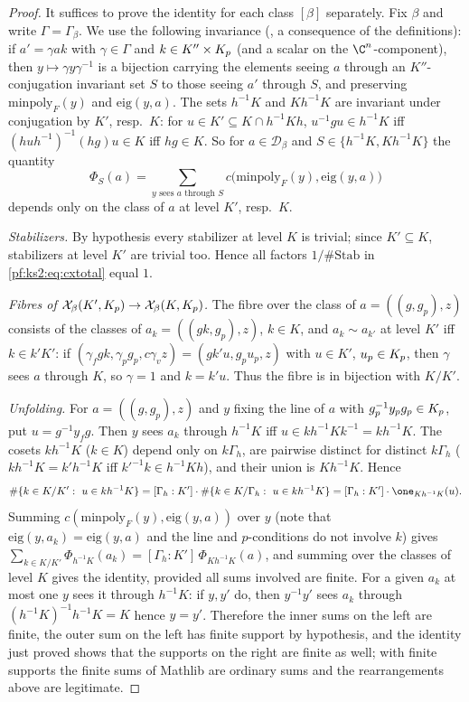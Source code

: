 \begin{proof}
It suffices to prove the identity for each class $[\beta]$ separately.
Fix $\beta$ and write $\Gamma=\Gamma_\beta$. We use the following invariance
(, a consequence of the definitions): if $a'=\gamma a k$
with $\gamma\in\Gamma$ and $k\in K''\times K_{p}$ (and a scalar on the $\C^n$-component), then
$y\mapsto\gamma y\gamma^{-1}$ is a bijection carrying the elements seeing $a$ through an
$K''$-conjugation invariant set $S$ to those seeing $a'$ through $S$, and preserving
$\mathrm{minpoly}_F(y)$ and $\mathrm{eig}(y,a)$. The sets $h^{-1}K$ and $Kh^{-1}K$ are invariant under
conjugation by $K'$, resp.\ $K$: for $u\in K'\subseteq K\cap h^{-1}Kh$, $u^{-1}gu\in h^{-1}K$ iff
$(huh^{-1})^{-1}(hg)u\in K$ iff $hg\in K$. So for $a\in\mathcal{D}_\beta$ and $S\in\{h^{-1}K,Kh^{-1}K\}$
the quantity
\[
\Phi_S(a)=\sum_{y\text{ sees }a\text{ through }S}c\bigl(\mathrm{minpoly}_F(y),\mathrm{eig}(y,a)\bigr)
\]
depends only on the class of $a$ at level $K'$, resp.\ $K$.

\emph{Stabilizers.} By hypothesis every stabilizer at level $K$ is trivial; since $K'\subseteq K$,
stabilizers at level $K'$ are trivial too. Hence all factors $1/\#\mathrm{Stab}$ in
\eqref{pf:ks2:eq:cxtotal} equal $1$.

\emph{Fibres of $\mathcal{X}_\beta(K',K_{p})\to\mathcal{X}_\beta(K,K_{p})$.} The fibre over the
class of $a=((g,g_p),z)$ consists of the classes of $a_k=((gk,g_p),z)$, $k\in K$, and $a_k\sim a_{k'}$
at level $K'$ iff $k\in k'K'$: if $(\gamma_fgk,\gamma_pg_p,c\gamma_vz)=(gk'u,g_pu_p,z)$ with $u\in K'$,
$u_p\in K_{p}$, then $\gamma$ sees $a$ through $K$, so $\gamma=1$ and $k=k'u$. Thus the fibre is in
bijection with $K/K'$.

\emph{Unfolding.} For $a=((g,g_p),z)$ and $y$ fixing the line of $a$ with $g_p^{-1}y_pg_p\in K_{p}$, put
$u=g^{-1}y_fg$. Then $y$ sees $a_k$ through $h^{-1}K$ iff $u\in kh^{-1}Kk^{-1}=kh^{-1}K$. The cosets
$kh^{-1}K$ ($k\in K$) depend only on $k\Gamma_h$, are pairwise distinct for distinct $k\Gamma_h$
($kh^{-1}K=k'h^{-1}K$ iff $k'^{-1}k\in h^{-1}Kh$), and their union is $Kh^{-1}K$. Hence
\[
\#\{k\in K/K':\ u\in kh^{-1}K\}=[\Gamma_h:K']\cdot\#\{k\in K/\Gamma_h:\ u\in kh^{-1}K\}
=[\Gamma_h:K']\cdot\one_{Kh^{-1}K}(u).
\]
Summing $c(\mathrm{minpoly}_F(y),\mathrm{eig}(y,a))$ over $y$ (note that $\mathrm{eig}(y,a_k)=\mathrm{eig}(y,a)$
and the line and $p$-conditions do not involve $k$) gives
$\sum_{k\in K/K'}\Phi_{h^{-1}K}(a_k)=[\Gamma_h:K']\,\Phi_{Kh^{-1}K}(a)$, and summing over the classes
of level $K$ gives the identity, provided all sums involved are finite. For a given $a_k$ at most one
$y$ sees it through $h^{-1}K$: if $y,y'$ do, then $y^{-1}y'$ sees $a_k$ through
$(h^{-1}K)^{-1}h^{-1}K=K$ hence $y=y'$. Therefore the inner sums
on the left are finite, the outer sum on the left has finite support by hypothesis, and the identity
just proved shows that the supports on the right are finite as well; with finite supports the
finite sums of Mathlib are ordinary sums and the rearrangements above are legitimate.
\end{proof}

